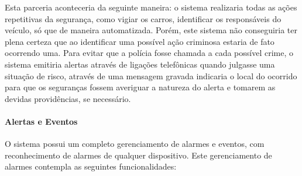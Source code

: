     Esta parceria aconteceria da seguinte maneira: o sistema realizaria todas as ações repetitivas da segurança, como vigiar os carros, identificar os responsáveis do veículo, só que de maneira automatizada. Porém, este sistema não conseguiria ter plena certeza que ao identificar uma possível ação criminosa estaria de fato ocorrendo uma. Para evitar que a polícia fosse chamada a cada possível crime, o sistema emitiria alertas através de ligações telefônicas quando julgasse uma situação de risco, através de uma mensagem gravada indicaria o local do ocorrido para que os seguranças fossem averiguar a natureza do alerta e tomarem as devidas providências, se necessário.
    
    \paragraph{Alertas e Eventos}
    O sistema possui um completo gerenciamento de alarmes e eventos, com reconhecimento de alarmes de qualquer dispositivo. Este gerenciamento de alarmes contempla as seguintes funcionalidades:
    
